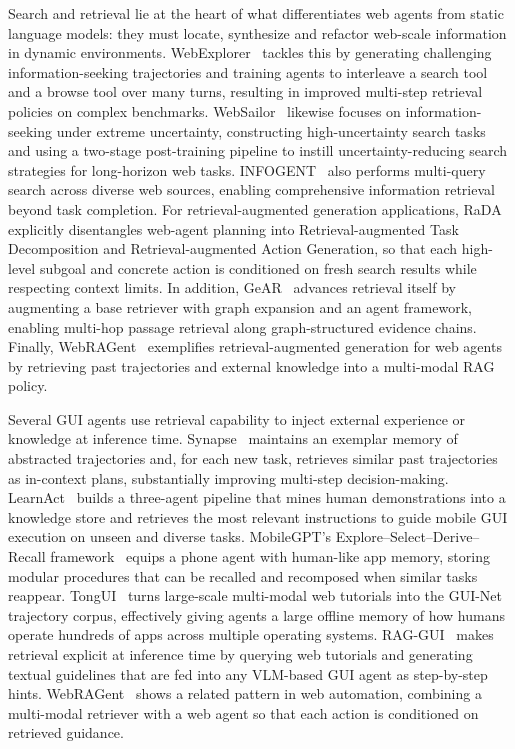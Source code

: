 Search and retrieval lie at the heart of what differentiates web agents from static language models: they must locate, synthesize and refactor web-scale information in dynamic environments. WebExplorer~\cite{liu2025webexplorer} tackles this by generating challenging information-seeking trajectories and training agents to interleave a search tool and a browse tool over many turns, resulting in improved multi-step retrieval policies on complex benchmarks. WebSailor~\cite{li2025websailor} likewise focuses on information-seeking under extreme uncertainty, constructing high-uncertainty search tasks and using a two-stage post-training pipeline  to instill uncertainty-reducing search strategies for long-horizon web tasks. INFOGENT~\cite{reddy2025infogent} also performs  multi-query search across diverse web sources, enabling comprehensive information retrieval beyond task completion. For retrieval-augmented generation applications, RaDA~\cite{kim2024rada} explicitly disentangles web-agent planning into Retrieval-augmented Task Decomposition and Retrieval-augmented Action Generation, so that each high-level subgoal and concrete action is conditioned on fresh search results while respecting context limits. In addition, GeAR~\cite{shen2025gear} advances retrieval itself by augmenting a base retriever with graph expansion and an agent framework, enabling multi-hop passage retrieval along graph-structured evidence chains. Finally, WebRAGent~\cite{anonymous2025webragent} exemplifies retrieval-augmented generation for web agents by retrieving past trajectories and external knowledge into a multi-modal RAG policy.



Several GUI agents use retrieval capability to inject external experience or knowledge at inference time. Synapse~\cite{zheng2023synapse} maintains an exemplar memory of abstracted trajectories and, for each new task, retrieves similar past trajectories as in-context plans, substantially improving multi-step decision-making. LearnAct~\cite{liu2025learnact} builds a three-agent pipeline that mines human demonstrations into a knowledge store and retrieves the most relevant instructions to guide mobile GUI execution on unseen and diverse tasks. MobileGPT’s Explore–Select–Derive–Recall framework~\cite{lee2023explore} equips a phone agent with human-like app memory, storing modular procedures that can be recalled and recomposed when similar tasks reappear. TongUI~\cite{zhang2025tonguiinternetscaletrajectoriesmultimodal} turns large-scale multi-modal web tutorials into the GUI-Net trajectory corpus, effectively giving agents a large offline memory of how humans operate hundreds of apps across multiple operating systems. RAG-GUI~\cite{xu2025retrieval} makes retrieval explicit at inference time by querying web tutorials and generating textual guidelines that are fed into any VLM-based GUI agent as step-by-step hints. WebRAGent~\cite{anonymous2025webragent} shows a related pattern in web automation, combining a multi-modal retriever with a web agent so that each action is conditioned on retrieved guidance.


